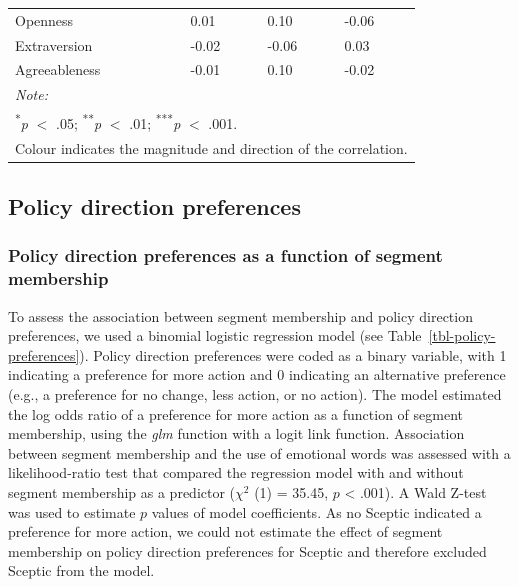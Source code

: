 \documentclass[
  letterpaper,
  DIV=11,
  numbers=noendperiod]{scrartcl}
\begin{document}
\begin{table}
\begin{tabular}[t]{l>{\raggedright\arraybackslash}p{6em}>{\raggedright\arraybackslash}p{6em}>{\raggedright\arraybackslash}p{6em}}
\hspace{1em}Openness & \textcolor[HTML]{FCF9E3}{0.01} & \textcolor[HTML]{F9EBDA}{0.10} & \textcolor[HTML]{F3F2D6}{-0.06}\\
\hspace{1em}Extraversion & \textcolor[HTML]{F8F7DE}{-0.02} & \textcolor[HTML]{F3F2D6}{-0.06} & \textcolor[HTML]{FCF7E2}{0.03}\\
\hspace{1em}Agreeableness & \textcolor[HTML]{FAF8E0}{-0.01} & \textcolor[HTML]{F9ECDB}{0.10} & \textcolor[HTML]{F8F7DE}{-0.02}\\
\bottomrule
\multicolumn{4}{l}{\rule{0pt}{1em}\textit{Note: }}\\
\multicolumn{4}{l}{\rule{0pt}{1em}\textsuperscript{*}\textit{p} $<$ .05; \textsuperscript{**}\textit{p} $<$ .01; \textsuperscript{***}\textit{p} $<$ .001.}\\
\multicolumn{4}{l}{\rule{0pt}{1em}\parbox{30em}{Colour indicates the magnitude and direction of the correlation.}}\\
\end{tabular}
\end{table}

\clearpage

\hypertarget{policy-direction-preferences}{%
\subsection{Policy direction
preferences}\label{policy-direction-preferences}}

\hypertarget{policy-direction-preferences-as-a-function-of-segment-membership}{%
\subsubsection{Policy direction preferences as a function of segment
membership}\label{policy-direction-preferences-as-a-function-of-segment-membership}}

To assess the association between segment membership and policy
direction preferences, we used a binomial logistic regression model (see
Table~\ref{tbl-policy-preferences}). Policy direction preferences were
coded as a binary variable, with 1 indicating a preference for more
action and 0 indicating an alternative preference (e.g., a preference
for no change, less action, or no action). The model estimated the log
odds ratio of a preference for more action as a function of segment
membership, using the \emph{glm} function with a logit link function.
Association between segment membership and the use of emotional words
was assessed with a likelihood-ratio test that compared the regression
model with and without segment membership as a predictor (\(\chi^{2}\)
(1) = 35.45, \(p\) \textless{} .001). A Wald Z-test was used to estimate
\(p\) values of model coefficients. As no Sceptic indicated a preference
for more action, we could not estimate the effect of segment membership
on policy direction preferences for Sceptic and therefore excluded
Sceptic from the model.
\end{document}
